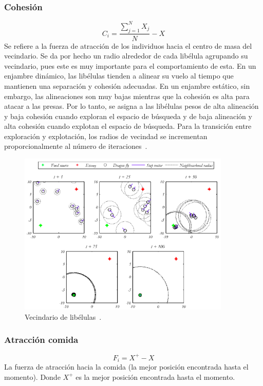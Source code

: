 \subsubsection{Cohesión}
\begin{equation}
    C_i = \frac{\sum_{j=1}^N X_j}{N} - X
\end{equation}
Se refiere a la fuerza de atracción de los individuos hacia el centro de masa del vecindario. Se da por hecho un radio alrededor de cada libélula agrupando su vecindario, pues este es muy importante para el comportamiento de esta. En un enjambre dinámico, las libélulas tienden a alinear su vuelo al tiempo que mantienen una separación y cohesión adecuadas. En un enjambre estático, sin embargo, las alineaciones son muy bajas mientras que la cohesión es alta para atacar a las presas. Por lo tanto, se asigna a las libélulas pesos de alta alineación y baja cohesión cuando exploran el espacio de búsqueda y de baja alineación y alta cohesión cuando explotan el espacio de búsqueda. Para la transición entre exploración y explotación, los radios de vecindad se incrementan proporcionalmente al número de iteraciones~\cite{mirjalili_dragonfly_2016}.
\begin{figure}[H]
    \centering
    \includegraphics[width=0.9\textwidth]{imagenes/da-operators.png}
    \caption[Vecindario de libélulas]{Vecindario de libélulas~\cite{mirjalili_dragonfly_2016}.}
\end{figure}

\subsubsection{Atracción comida}
\begin{equation}
    F_i = X^+ - X
\end{equation}
La fuerza de atracción hacia la comida (la mejor posición encontrada hasta el momento). Donde $X^+$ es la mejor posición encontrada hasta el momento.

